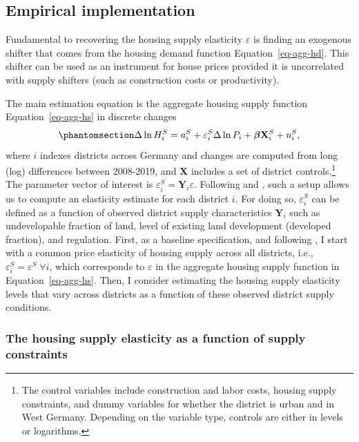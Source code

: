 \documentclass[
  12pt,
]{article}
\begin{document}
\subsection{Empirical implementation}\label{empirical-implementation}

Fundamental to recovering the housing supply elasticity \(\varepsilon\)
is finding an exogenous shifter that comes from the housing demand
function Equation~\ref{eq-agg-hd}. This shifter can be used as an
instrument for house prices provided it is uncorrelated with supply
shifters (such as construction costs or productivity).

The main estimation equation is the aggregate housing supply function
Equation~\ref{eq-agg-hs} in discrete changes
\begin{equation}\phantomsection\label{eq-main}{
\Delta\ln H_i^S =  a^S_i + \varepsilon^S_i\Delta\ln P_i + \boldsymbol{\beta}\mathbf{X}^S_i + u^S_i, 
}\end{equation} where \(i\) indexes districts across Germany and changes
are computed from long (log) differences between 2008-2019, and
\(\mathbf{X}\) includes a set of district controls.\footnote{The control
  variables include construction and labor costs, housing supply
  constraints, and dummy variables for whether the district is urban and
  in West Germany. Depending on the variable type, controls are either
  in levels or logarithms.} The parameter vector of interest is
\(\varepsilon^S_i=\mathbf{Y}_i\varepsilon\). Following \citet{saiz_2010}
and \citet{baum-snow_han_2019}, such a setup allows us to compute an
elasticity estimate for each district \(i\). For doing so,
\(\varepsilon^S_i\) can be defined as a function of observed district
supply characteristics \(\mathbf{Y}_i\) such as undevelopable fraction
of land, level of existing land development (developed fraction), and
regulation. First, as a baseline specification, and following
\citet{saiz_2010}, I start with a common price elasticity of housing
supply across all districts, i.e.,
\(\varepsilon^S_i=\varepsilon^S \;\forall i\), which corresponds to
\(\varepsilon\) in the aggregate housing supply function in
Equation~\ref{eq-agg-hs}. Then, I consider estimating the housing supply
elasticity levels that vary across districts as a function of these
observed district supply conditions.

\subsubsection{The housing supply elasticity as a function of supply
constraints}\label{sec-decompose}
\end{document}
